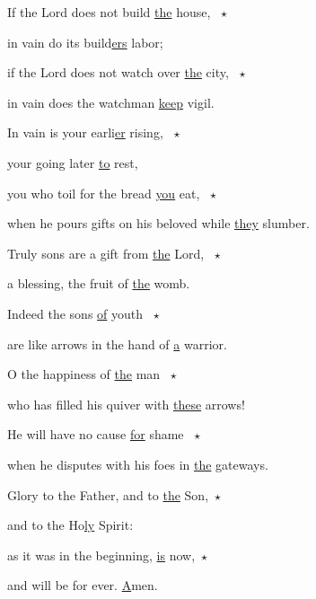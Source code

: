 \noindent If the Lord does not build \uline{the} house, ~$\star$~\nopagebreak

in vain do its build\uline{ers} labor;

\noindent if the Lord does not watch over \uline{the} city, ~$\star$~\nopagebreak

in vain does the watchman \uline{keep} vigil.

\noindent In vain is your earli\uline{er} rising, ~$\star$~\nopagebreak

your going later \uline{to} rest,

\noindent you who toil for the bread \uline{you} eat, ~$\star$~\nopagebreak

when he pours gifts on his beloved while \uline{they} slumber.

\noindent Truly sons are a gift from \uline{the} Lord, ~$\star$~\nopagebreak

a blessing, the fruit of \uline{the} womb.

\noindent Indeed the sons \uline{of} youth ~$\star$~\nopagebreak

are like arrows in the hand of \uline{a} warrior.

\noindent O the happiness of \uline{the} man ~$\star$~\nopagebreak

who has filled his quiver with \uline{these} arrows!

\noindent He will have no cause \uline{for} shame ~$\star$~\nopagebreak

when he disputes with his foes in \uline{the} gateways. 

\noindent Glory to the Father, and to \uline{the} Son,~$\star$~\nopagebreak

and to the Ho\uline{ly} Spirit:

\noindent as it was in the beginning, \uline{is} now,~$\star$~\nopagebreak

and will be for ever. \uline{A}men.